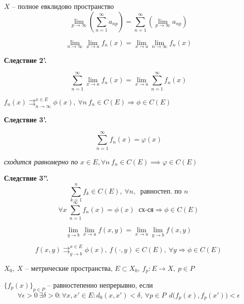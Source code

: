     \begin{corollary}
        $X$ -- полное евклидово пространство
        \[
            \lim_{p \rightarrow \infty} \left(\sum_{n=1}^\infty a_{np}\right) = \sum_{n=1}^\infty \left( \lim_{p \rightarrow \infty} a_{np}\right)
        \]
    \end{corollary}
    
    \begin{corollary}
        \[
            \lim_{n \rightarrow \infty} \lim_{x \rightarrow a} f_n(x)  = \lim_{x \rightarrow a} \lim_{n \rightarrow \infty} f_n(x)   
        \]
    \end{corollary}

    {\noindent \textbf{Следствие 2'.}}

    $$\sum_{n=1}^\infty \lim_{x\to a}f_n(x) = \lim_{x \to a}\sum^\infty_{n=1} f_n(x)$$

    
    \begin{corollary}
        $f_n(x) \rightrightarrows_{n \rightarrow \infty}^{x \in E} \phi(x), \ \forall n \ f_n \in C(E) \Rightarrow \phi \in C(E)$
    \end{corollary}

    {\noindent \textbf{Следствие 3'.}}

    $$\sum^{\infty}_{n=1}f_n(x) = \varphi(x)$$

    \textit{сходится равномерно по $x \in E, \forall n \ f_n \in C(E) \implies \varphi \in C(E)$}


    {\noindent \textbf{Следствие 3''.}} %
        \[
            \sum_{k = 1}^n f_k \in C(E), \ \forall n, \ \textit{ равностеп. по } n 
        \]
        \[
            \forall x \ \sum_{n=1}^\infty f_n(x) = \phi(x) \ \text{ сх-ся} \Rightarrow \phi \in C(E)   
        \]

    \begin{corollary}
        \[
            \lim_{y \rightarrow b} \lim_{x \rightarrow a} f(x, y) = \lim_{x \rightarrow a} \lim_{y \rightarrow b} f(x, y)    
        \]
    \end{corollary}

    \begin{corollary}
        \[
            f(x, y) \rightrightarrows_{y \rightarrow b}^{x \in E} \phi(x), \ f(\cdot, y) \in C(E), \ \forall y \Rightarrow \phi \in C(E)  
        \]
    \end{corollary}

    \begin{definition}
        $X_0, \ X$ -- метрические пространства, $E \subset X_0, \ f_p : E \rightarrow X, \ p \in P$
        \par $\{f_p(x)\}_{p \in P}$ -- равностепенно непрерывно, если
        \[
            \forall \epsilon > 0 \ \exists \delta > 0 : \forall x, x' \in E : d_0(x, x') < \delta, \ \forall p \in P \ \ d\big(f_p(x), f_p(x')\big) < \epsilon    
        \]
    \end{definition}

